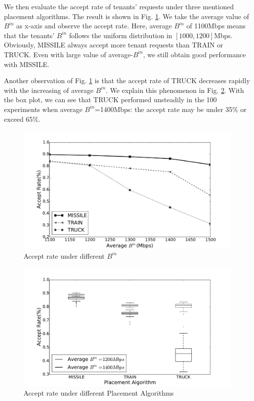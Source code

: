 \documentclass[10pt, conference, letterpaper]{IEEEtran}
\begin{document}
We then evaluate the accept rate of tenants' requests under three mentioned placement algorithms. The result is shown in Fig. \ref{fig:acc_rate}. We take the average value of $B^{in}$ as x-axis and observe the accept rate. Here, average $B^{in}$ of 1100Mbps means that the tenants' $B^{in}$ follows the uniform distribution in $[1000, 1200]$Mbps. Obviously, MISSILE always accept more tenant requests than TRAIN or TRUCK. Even with large value of average-$B^{in}$, we still obtain good performance with MISSILE. 

Another observation of Fig. \ref{fig:acc_rate} is that the accept rate of TRUCK decreases rapidly with the increasing of average $B^{in}$. We explain this phenomenon in Fig. \ref{fig:acc_rate_boxplot}. With the box plot, we can see that TRUCK performed unsteadily in the 100 experiments when average $B^{in}$=1400Mbps: the accept rate may be under 35\% or exceed 65\%.

\begin{figure}
\center
    \includegraphics[width=2.8 in]{fig/acc_util.pdf}
    \caption{Accept rate under different $B^{in}$}
    \label{fig:acc_rate}
\end{figure}

\begin{figure}
\center
    \includegraphics[width=2.8 in]{fig/accbox1400_1200.pdf}
    \caption{Accept rate under different Placement Algorithms}
    \label{fig:acc_rate_boxplot}
\end{figure}
\end{document}
